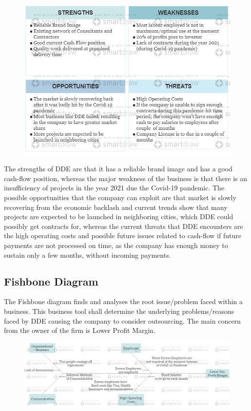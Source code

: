 	\begin{figure}[H]
    	\centering
    	\includegraphics[width=15cm]{SWOT Analysis.png}
    	\label{}
	\end{figure}

	{The strengths of DDE are that it has a reliable brand image and has a good cash-flow position, whereas the major weakness of the business is that there is an insufficiency of projects in the year 2021 due the Covid-19 pandemic. The possible opportunities that the company can exploit are that market is slowly recovering from the economic backlash and current trends show that many projects are expected to be launched in neighboring cities, which DDE could possibly get contracts for, whereas the current threats that DDE encounters are the high operating costs and possible future issues related to cash-flow if future payments are not processed on time, as the company has enough money to sustain only a few months, without incoming payments.}	

\subsection{Fishbone Diagram}

	{The Fishbone diagram finds and analyses the root issue/problem faced within a business. This business tool shall determine the underlying problems/reasons faced by DDE causing the company to consider outsourcing. The main concern from the owner of the firm is Lower Profit Margin.}
	
	\begin{figure}[H]
    	\centering
    	\includegraphics[width=15cm]{Fishbone Diagram.png}
    	\label{}
	\end{figure}

